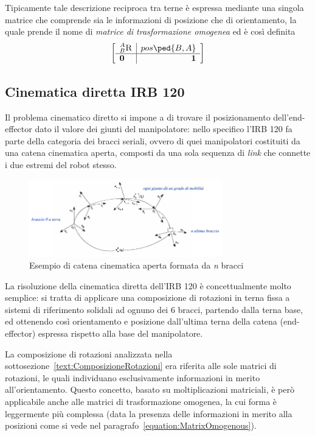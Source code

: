 Tipicamente tale descrizione reciproca tra terne è espressa mediante una singola matrice che comprende sia le informazioni di posizione che di orientamento, la quale prende il nome di \emph{matrice di trasformazione omogenea} ed è così definita
\begin{equation*}
	\label{equation:MatrixOmogenous}
	\left[
	\begin{array}{l|r}
		\prescript{A}{B}{\textsc{R}}&pos\ped{B,A}\\ \hline
		\vec{0} & \vec{1}
	\end{array}
	\right]
\end{equation*}



\newpage
\subsection{Cinematica diretta IRB 120}

Il problema cinematico diretto si impone a di trovare il posizionamento dell'end-effector dato il valore dei giunti del manipolatore: nello specifico l'IRB 120 fa parte della categoria dei bracci seriali, ovvero di quei manipolatori costituiti da una catena cinematica aperta, composti da una sola sequenza di \emph{link} che connette i due estremi del robot stesso.
\begin{figure}[h]
	\centering
	\includegraphics[width=0.75\textwidth]{Immagini/CatenaCinematicaOpen_Example}
	\caption{Esempio di catena cinematica aperta formata da \emph{n} bracci \cite{book:RobotIndustriali}} 
	\label{fig:CatenaCinematicaOpen}
\end{figure}
La risoluzione della cinematica diretta dell'IRB 120 è concettualmente molto semplice: si tratta di applicare una composizione di rotazioni in terna fissa a sistemi di riferimento solidali ad ognuno dei 6 bracci, partendo dalla terna base, ed ottenendo così orientamento e posizione dall'ultima terna della catena (end-effector) espressa rispetto alla base del manipolatore.

La composizione di rotazioni analizzata nella sottosezione~\vref{text:ComposizioneRotazioni} era riferita alle sole matrici di rotazioni, le quali individuano esclusivamente informazioni in merito all'orientamento. Questo concetto, basato su moltiplicazioni matriciali, è però applicabile anche alle matrici di trasformazione omogenea, la cui forma è leggermente più complessa (data la presenza delle informazioni in merito alla posizioni come si vede nel paragrafo~\vref{equation:MatrixOmogenous}).

